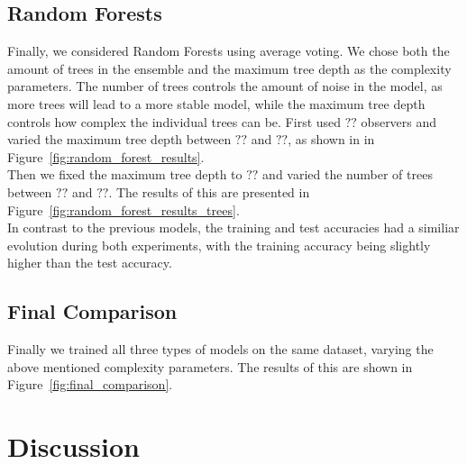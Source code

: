 \documentclass[11pt]{article}
\begin{document}
\subsection{Random Forests}
Finally, we considered Random Forests using average voting. We chose both the amount of trees in the ensemble and the maximum tree depth as the complexity parameters. The number of trees controls the amount of noise in the model, as more trees will lead to a more stable model, while the maximum tree depth controls how complex the individual trees can be. First used $??$ observers and varied the maximum tree depth between $??$ and $??$, as shown in in Figure~\ref{fig:random_forest_results}. \\
Then we fixed the maximum tree depth to $??$ and varied the number of trees between $??$ and $??$. The results of this are presented in Figure~\ref{fig:random_forest_results_trees}. \\
In contrast to the previous models, the training and test accuracies had a similiar evolution during both experiments, with the training accuracy being slightly higher than the test accuracy.

\subsection{Final Comparison}
Finally we trained all three types of models on the same dataset, varying the above mentioned complexity parameters. The results of this are shown in Figure~\ref{fig:final_comparison}. 



\section{Discussion}
\end{document}
